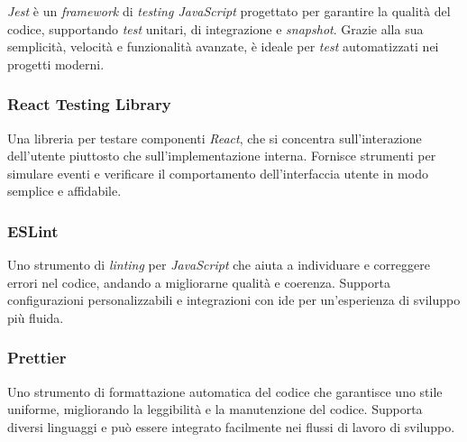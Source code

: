 \textit{Jest} è un \textit{framework} di \textit{testing JavaScript} progettato per garantire la qualità del codice, supportando \textit{test} unitari, di integrazione e \textit{snapshot}.
Grazie alla sua semplicità, velocità e funzionalità avanzate, è ideale per \textit{test} automatizzati nei progetti moderni.

\subsubsection{React Testing Library}

Una libreria per testare componenti \textit{React}, che si concentra sull'interazione dell'utente piuttosto che sull'implementazione interna. 
Fornisce strumenti per simulare eventi e verificare il comportamento dell'interfaccia utente in modo semplice e affidabile.

\subsubsection{ESLint}

Uno strumento di \textit{linting} per \textit{JavaScript} che aiuta a individuare e correggere errori nel codice, andando a migliorarne qualità e coerenza.
Supporta configurazioni personalizzabili e integrazioni con \gls{ide} per un'esperienza di sviluppo più fluida.

\subsubsection{Prettier}

Uno strumento di formattazione automatica del codice che garantisce uno stile uniforme, migliorando la leggibilità e la manutenzione del codice. 
Supporta diversi linguaggi e può essere integrato facilmente nei flussi di lavoro di sviluppo.